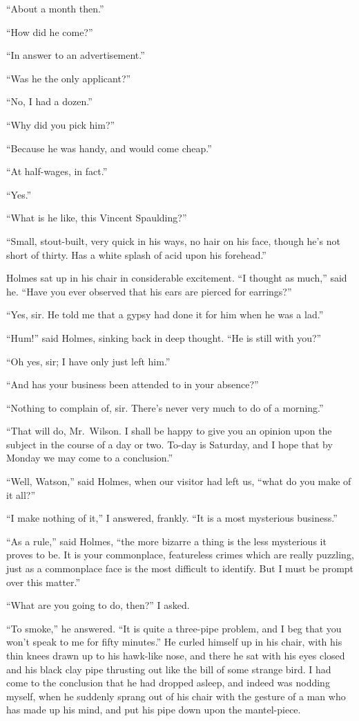 “About a month then.”

“How did he come?”

“In answer to an advertisement.”

“Was he the only applicant?”

“No, I had a dozen.”

“Why did you pick him?”

“Because he was handy, and would come cheap.”

“At half-wages, in fact.”

“Yes.”

“What is he like, this Vincent Spaulding?”

“Small, stout-built, very quick in his ways, no hair on his
face, though he’s not short of thirty. Has a white splash of
acid upon his forehead.”

Holmes sat up in his chair in considerable excitement. “I
thought as much,” said he. “Have you ever observed that
his ears are pierced for earrings?”

“Yes, sir. He told me that a gypsy had done it for him
when he was a lad.”

“Hum!” said Holmes, sinking back in deep thought. “He
is still with you?”

“Oh yes, sir; I have only just left him.”

“And has your business been attended to in your absence?”

“Nothing to complain of, sir. There’s never very much to
do of a morning.”

“That will do, Mr.~Wilson. I shall be happy to give you
an opinion upon the subject in the course of a day or two.
To-day is Saturday, and I hope that by Monday we may
come to a conclusion.”

“Well, Watson,” said Holmes, when our visitor had left us,
“what do you make of it all?”

“I make nothing of it,” I answered, frankly. “It is a
most mysterious business.”

“As a rule,” said Holmes, “the more bizarre a thing is the
less mysterious it proves to be. It is your commonplace,
featureless crimes which are really puzzling, just as a commonplace
face is the most difficult to identify. But I must
be prompt over this matter.”

“What are you going to do, then?” I asked.

“To smoke,” he answered. “It is quite a three-pipe
problem, and I beg that you won’t speak to me for fifty minutes.”
He curled himself up in his chair, with his thin knees
drawn up to his hawk-like nose, and there he sat with his eyes
closed and his black clay pipe thrusting out like the bill of
some strange bird. I had come to the conclusion that he
had dropped asleep, and indeed was nodding myself, when he
suddenly sprang out of his chair with the gesture of a man
who has made up his mind, and put his pipe down upon the
mantel-piece.

